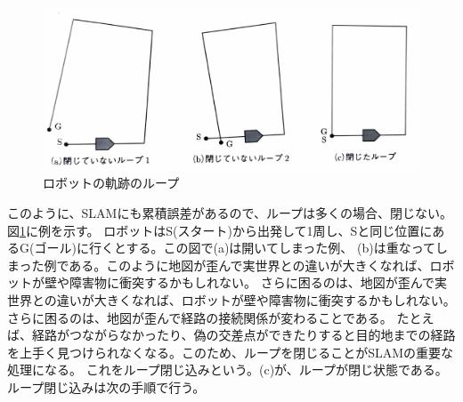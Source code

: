 \begin{figure}[h]
  \begin{center}
  \includegraphics[width=.8\linewidth]{img/slam_9.pdf}
  \caption{ロボットの軌跡のループ}
  \label{slam:loop_kiseki}
  \end{center}
\end{figure}

このように、SLAMにも累積誤差があるので、ループは多くの場合、閉じない。図\ref{slam:loop_kiseki}に例を示す。
ロボットはS(スタート)から出発して1周し、Sと同じ位置にあるG(ゴール)に行くとする。この図で(a)は開いてしまった例、
(b)は重なってしまった例である。このように地図が歪んで実世界との違いが大きくなれば、ロボットが壁や障害物に衝突するかもしれない。
さらに困るのは、地図が歪んで実世界との違いが大きくなれば、ロボットが壁や障害物に衝突するかもしれない。さらに困るのは、地図が歪んで経路の接続関係が変わることである。
たとえば、経路がつながらなかったり、偽の交差点ができたりすると目的地までの経路を上手く見つけられなくなる。このため、ループを閉じることがSLAMの重要な処理になる。
これをループ閉じ込みという。(c)が、ループが閉じ状態である。ループ閉じ込みは次の手順で行う。

